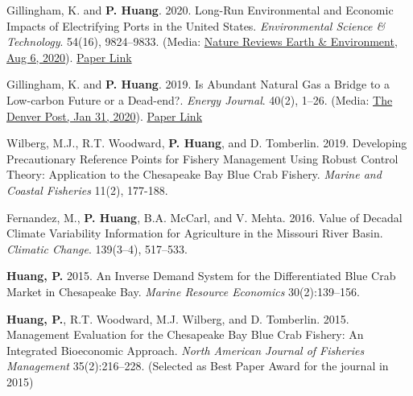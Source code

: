 



\begin{pubitems} %
    \item {Gillingham, K. and {\bf P. Huang}. 2020. Long-Run Environmental and Economic Impacts of Electrifying Ports in the United States. \textit{Environmental Science \& Technology}. 54(16), 9824--9833. (Media: \href{https://www.nature.com/articles/s43017-020-0090-6}{Nature Reviews Earth \& Environment, Aug 6, 2020}). \href{https://www.dropbox.com/s/0g1fmsu6kdwhhhg/GillinghamHuang_EST2020.pdf?dl=0}{Paper Link}}
    \item {Gillingham, K. and {\bf P. Huang}. 2019. Is Abundant Natural Gas a Bridge to a Low-carbon Future or a Dead-end?. \textit{Energy Journal}. 40(2), 1--26. (Media: \href{https://www.denverpost.com/2020/01/31/colorado-natural-gas-bridge-fuel-wind-solar-xcel-tri-state/}{The Denver Post, Jan 31, 2020}). \href{https://www.iaee.org/en/Publications/ejarticle.aspx?id=3325}{Paper Link}}
    \item {Wilberg, M.J., R.T. Woodward, {\bf P. Huang}, and D. Tomberlin. 2019. Developing Precautionary Reference Points for Fishery Management Using Robust Control Theory: Application to the Chesapeake Bay Blue Crab Fishery. \textit{Marine and Coastal Fisheries} 11(2), 177-188.}
    \item {Fernandez, M., {\bf P. Huang}, B.A. McCarl, and V. Mehta. 2016. Value of Decadal Climate Variability Information for Agriculture in the Missouri River Basin. \textit{Climatic Change}. 139(3--4), 517--533.}
    \item {\textbf{Huang, P.} 2015. An Inverse Demand System for the Differentiated Blue Crab Market in Chesapeake Bay. {\itshape Marine Resource Economics} 30(2):139--156.}
    \item {\textbf{Huang, P.}, R.T. Woodward, M.J. Wilberg, and D. Tomberlin. 2015. Management Evaluation for the Chesapeake Bay Blue Crab Fishery: An Integrated Bioeconomic Approach. {\itshape North American Journal of Fisheries Management} 35(2):216--228. (Selected as Best Paper Award for the journal in 2015)}
\end{pubitems}


